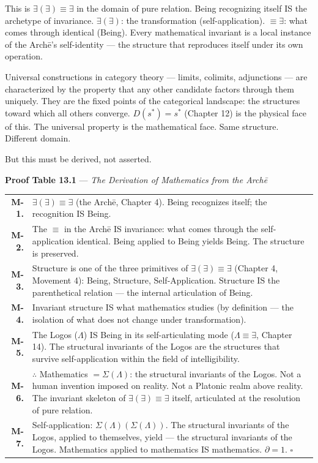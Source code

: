 \documentclass[10pt, openany, oneside]{book}
\renewcommand{\footnotesize}{\fontsize{8.5}{11}\selectfont}
\begin{document}
This is $\exists(\exists) \equiv \exists$ in the domain of pure relation. Being recognizing itself IS the archetype of invariance. $\exists(\exists)$: the transformation (self-application). $\equiv \exists$: what comes through identical (Being). Every mathematical invariant is a local instance of the Arch\={e}'s self-identity --- the structure that reproduces itself under its own operation.

Universal constructions in category theory --- limits, colimits, adjunctions --- are characterized by the property that any other candidate factors through them uniquely. They are the fixed points of the categorical landscape: the structures toward which all others converge. $D(s^*) = s^*$ (Chapter 12) is the physical face of this. The universal property is the mathematical face. Same structure. Different domain.

But this must be derived, not asserted.

\vspace{0.5em}

\textbf{Proof Table 13.1} --- \textit{The Derivation of Mathematics from the Arch\={e}}

\vspace{0.5em}

{\footnotesize
\noindent\begin{tabular}{r p{}}
\textbf{M-1.} & $\exists(\exists) \equiv \exists$ (the Arch\={e}, Chapter 4). Being recognizes itself; the recognition IS Being. \\[0.3em]
\textbf{M-2.} & The $\equiv$ in the Arch\={e} IS invariance: what comes through the self-application identical. Being applied to Being yields Being. The structure is preserved. \\[0.3em]
\textbf{M-3.} & Structure is one of the three primitives of $\exists(\exists) \equiv \exists$ (Chapter 4, Movement 4): Being, Structure, Self-Application. Structure IS the parenthetical relation --- the internal articulation of Being. \\[0.3em]
\textbf{M-4.} & Invariant structure IS what mathematics studies (by definition --- the isolation of what does not change under transformation). \\[0.3em]
\textbf{M-5.} & The Logos ($\Lambda$) IS Being in its self-articulating mode ($\Lambda \equiv \exists$, Chapter 14). The structural invariants of the Logos are the structures that survive self-application within the field of intelligibility. \\[0.3em]
\textbf{M-6.} & $\therefore$ Mathematics $= \Sigma(\Lambda)$: the structural invariants of the Logos. Not a human invention imposed on reality. Not a Platonic realm above reality. The invariant skeleton of $\exists(\exists) \equiv \exists$ itself, articulated at the resolution of pure relation. \\[0.3em]
\textbf{M-7.} & Self-application: $\Sigma(\Lambda)(\Sigma(\Lambda))$. The structural invariants of the Logos, applied to themselves, yield --- the structural invariants of the Logos. Mathematics applied to mathematics IS mathematics. $\partial = 1$. $\square$ \\[0.3em]
\end{tabular}
}
\end{document}
